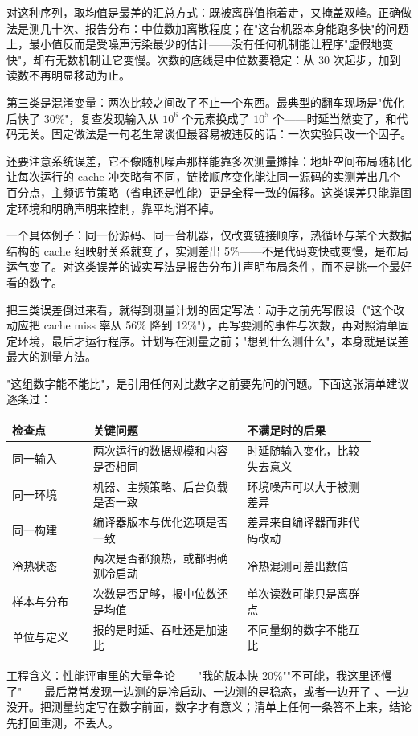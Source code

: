 对这种序列，取均值是最差的汇总方式：既被离群值拖着走，又掩盖双峰。正确做法是测几十次、报告分布：中位数加离散程度；在"这台机器本身能跑多快"的问题上，最小值反而是受噪声污染最少的估计——没有任何机制能让程序"虚假地变快"，却有无数机制让它变慢。次数的底线是中位数要稳定：从 30 次起步，加到读数不再明显移动为止。

第三类是混淆变量：两次比较之间改了不止一个东西。最典型的翻车现场是"优化后快了 30\%"，复查发现输入从 $10^{6}$ 个元素换成了 $10^{5}$ 个——时延当然变了，和代码无关。固定做法是一句老生常谈但最容易被违反的话：一次实验只改一个因子。

还要注意系统误差，它不像随机噪声那样能靠多次测量摊掉：地址空间布局随机化让每次运行的 cache 冲突略有不同，链接顺序变化能让同一源码的实测差出几个百分点，主频调节策略（省电还是性能）更是全程一致的偏移。这类误差只能靠固定环境和明确声明来控制，靠平均消不掉。

一个具体例子：同一份源码、同一台机器，仅改变链接顺序，热循环与某个大数据结构的 cache 组映射关系就变了，实测差出 5\%——不是代码变快或变慢，是布局运气变了。对这类误差的诚实写法是报告分布并声明布局条件，而不是挑一个最好看的数字。

把三类误差倒过来看，就得到测量计划的固定写法：动手之前先写假设（"这个改动应把 cache miss 率从 56\% 降到 12\%"），再写要测的事件与次数，再对照清单固定环境，最后才运行程序。计划写在测量之前；"想到什么测什么"，本身就是误差最大的测量方法。

"这组数字能不能比"，是引用任何对比数字之前要先问的问题。下面这张清单建议逐条过：

\begin{longtable}{L{0.20\linewidth}L{0.38\linewidth}L{0.32\linewidth}}
\toprule
检查点 & 关键问题 & 不满足时的后果 \\
\midrule
同一输入 & 两次运行的数据规模和内容是否相同 & 时延随输入变化，比较失去意义 \\
同一环境 & 机器、主频策略、后台负载是否一致 & 环境噪声可以大于被测差异 \\
同一构建 & 编译器版本与优化选项是否一致 & 差异来自编译器而非代码改动 \\
冷热状态 & 两次是否都预热，或都明确测冷启动 & 冷热混测可差出数倍 \\
样本与分布 & 次数是否足够，报中位数还是均值 & 单次读数可能只是离群点 \\
单位与定义 & 报的是时延、吞吐还是加速比 & 不同量纲的数字不能互比 \\
\bottomrule
\end{longtable}

工程含义：性能评审里的大量争论——"我的版本快 20\%""不可能，我这里还慢了"——最后常常发现一边测的是冷启动、一边测的是稳态，或者一边开了 、一边没开。把测量约定写在数字前面，数字才有意义；清单上任何一条答不上来，结论先打回重测，不丢人。

